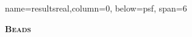 \documentclass[a0paper,portrait,fontscale=0.35]{baposter}
\theoremstyle{plain}
\theoremstyle{plain}
\theoremstyle{definition}
\theoremstyle{plain}
\theoremstyle{definition}
\begin{document}
\begin{poster}
{%
}


{name=resultsreal,column=0, below=psf, span=6}{
  \begin{minipage}[t]{0.51\textwidth} 
    \begin{center}
      \larger
      \textbf{\textsc{Beads}}
    \end{center}


\end{minipage}}
\end{poster}
\end{document}
